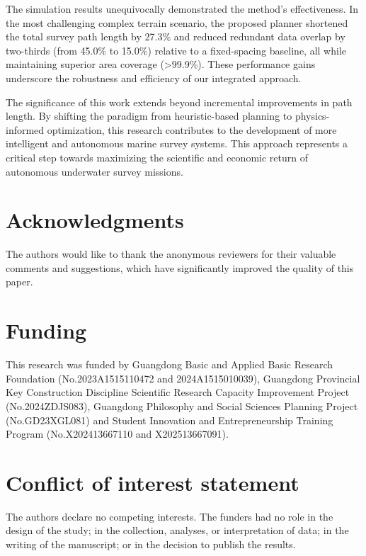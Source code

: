 \documentclass[compress]{cm}
\begin{document}
The simulation results unequivocally demonstrated the method's effectiveness. In the most challenging complex terrain scenario, the proposed planner shortened the total survey path length by 27.3\% and reduced redundant data overlap by two-thirds (from 45.0\% to 15.0\%) relative to a fixed-spacing baseline, all while maintaining superior area coverage (>99.9\%). These performance gains underscore the robustness and efficiency of our integrated approach.

The significance of this work extends beyond incremental improvements in path length. By shifting the paradigm from heuristic-based planning to physics-informed optimization, this research contributes to the development of more intelligent and autonomous marine survey systems. This approach represents a critical step towards maximizing the scientific and economic return of autonomous underwater survey missions.

\section*{Acknowledgments}
The authors would like to thank the anonymous reviewers for their valuable comments and suggestions, which have significantly improved the quality of this paper.

\section*{Funding}
This research was funded by Guangdong Basic and Applied Basic Research Foundation (No.2023A1515110472 and 2024A1515010039), Guangdong Provincial Key Construction Discipline Scientific Research Capacity Improvement Project (No.2024ZDJS083), Guangdong Philosophy and Social Sciences Planning Project (No.GD23XGL081) and Student Innovation and Entrepreneurship Training Program (No.X202413667110 and X202513667091).

\section*{Conflict of interest statement}
The authors declare no competing interests. The funders had no role in the design of the study; in the collection, analyses, or interpretation of data; in the writing of the manuscript; or in the decision to publish the results.
\end{document}
